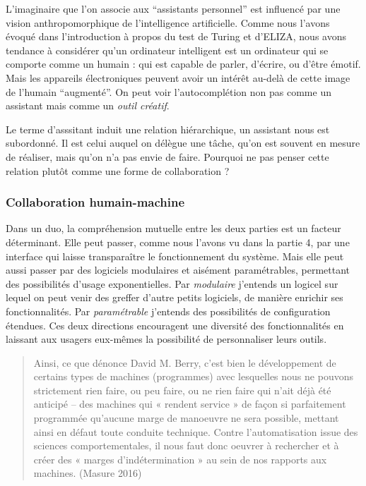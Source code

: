 \documentclass[]{article}
\begin{document}
L'imaginaire que l'on associe aux ``assistants personnel'' est influencé
par une vision anthropomorphique de l'intelligence artificielle. Comme
nous l'avons évoqué dans l'introduction à propos du test de Turing et
d'ELIZA, nous avons tendance à considérer qu'un ordinateur intelligent
est un ordinateur qui se comporte comme un humain : qui est capable de
parler, d'écrire, ou d'être émotif. Mais les appareils électroniques
peuvent avoir un intérêt au-delà de cette image de l'humain
``augmenté''. On peut voir l'autocomplétion non pas comme un assistant
mais comme un \emph{outil créatif}.

Le terme d'asssitant induit une relation hiérarchique, un assistant nous
est subordonné. Il est celui auquel on délègue une tâche, qu'on est
souvent en mesure de réaliser, mais qu'on n'a pas envie de faire.
Pourquoi ne pas penser cette relation plutôt comme une forme de
collaboration ?

\hypertarget{collaboration-humain-machine}{%
\subsubsection{Collaboration
humain-machine}\label{collaboration-humain-machine}}

Dans un duo, la compréhension mutuelle entre les deux parties est un
facteur déterminant. Elle peut passer, comme nous l'avons vu dans la
partie 4, par une interface qui laisse transparaître le fonctionnement
du système. Mais elle peut aussi passer par des logiciels modulaires et
aisément paramétrables, permettant des possibilités d'usage
exponentielles. Par \emph{modulaire} j'entends un logicel sur lequel on
peut venir des greffer d'autre petits logiciels, de manière enrichir ses
fonctionnalités. Par \emph{paramétrable} j'entends des possibilités de
configuration étendues. Ces deux directions encouragent une diversité
des fonctionnalités en laissant aux usagers eux-mêmes la possibilité de
personnaliser leurs outils.

\begin{quote}
Ainsi, ce que dénonce David M. Berry, c'est bien le développement de
certains types de machines (programmes) avec lesquelles nous ne pouvons
strictement rien faire, ou peu faire, ou ne rien faire qui n'ait déjà
été anticipé -- des machines qui « rendent service » de façon si
parfaitement programmée qu'aucune marge de manoeuvre ne sera possible,
mettant ainsi en défaut toute conduite technique. Contre
l'automatisation issue des sciences comportementales, il nous faut donc
oeuvrer à rechercher et à créer des « marges d'indétermination » au sein
de nos rapports aux machines. (Masure 2016)
\end{quote}
\end{document}
